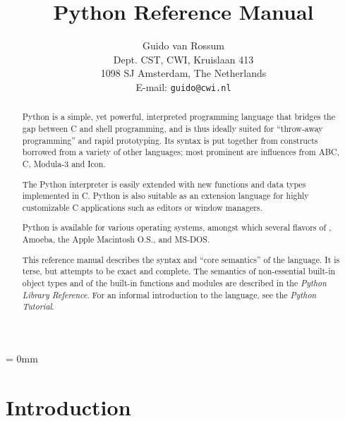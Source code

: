 
\title{\bf Python Reference Manual}

\author{
	Guido van Rossum \\
	Dept. CST, CWI, Kruislaan 413 \\
	1098 SJ Amsterdam, The Netherlands \\
	E-mail: {\tt guido@cwi.nl}
}

\makeindex




\maketitle

\begin{abstract}

\noindent
Python is a simple, yet powerful, interpreted programming language
that bridges the gap between C and shell programming, and is thus
ideally suited for ``throw-away programming'' and rapid prototyping.
Its syntax is put together from constructs borrowed from a variety of
other languages; most prominent are influences from ABC, C, Modula-3
and Icon.

The Python interpreter is easily extended with new functions and data
types implemented in C.  Python is also suitable as an extension
language for highly customizable C applications such as editors or
window managers.

Python is available for various operating systems, amongst which
several flavors of {\UNIX}, Amoeba, the Apple Macintosh O.S.,
and MS-DOS.

This reference manual describes the syntax and ``core semantics'' of
the language.  It is terse, but attempts to be exact and complete.
The semantics of non-essential built-in object types and of the
built-in functions and modules are described in the {\em Python
Library Reference}.  For an informal introduction to the language, see
the {\em Python Tutorial}.

\end{abstract}

\pagebreak

{
\parskip = 0mm
\tableofcontents
}

\pagebreak


\chapter{Introduction}

